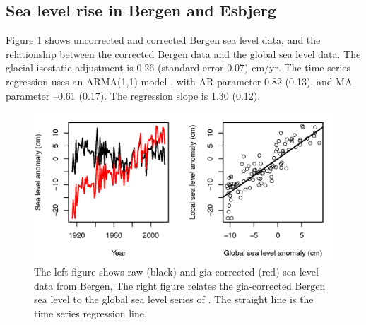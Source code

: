 \documentclass[note,screen,british,11pt]{nrdoc}
\begin{document}
\subsection{Sea level rise in Bergen and Esbjerg}

Figure \ref{fig:bergenobs} shows uncorrected and corrected Bergen sea level data, and the relationship between the corrected Bergen data and the global sea level data. The glacial isostatic adjustment is 0.26 (standard error 0.07) cm/yr. The time series regression uses an ARMA(1,1)-model \citep{boxjenkins}, with AR parameter 0.82 (0.13), and MA parameter --0.61 (0.17). The regression slope is 1.30 (0.12).

\begin{figure}[!hbpt]
\begin{center}
\includegraphics[width=0.75\linewidth]{bergenfit_edit.png}
\caption{ The left figure shows raw (black) and gia-corrected (red) sea level data from Bergen, The right figure relates the gia-corrected Bergen sea level to the global sea level series of \citet{csiro}. The straight line is the time series regression line.}
\label{fig:bergenobs}
\end{center}
\end{figure}
\end{document}
